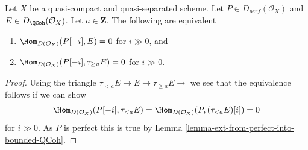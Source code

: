 \begin{lemma}
\label{lemma-bounded-truncation}
Let $X$ be a quasi-compact and quasi-separated scheme.
Let $P \in D_{perf}(\mathcal{O}_X)$ and $E \in D_{\QCoh}(\mathcal{O}_X)$. 
Let $a \in \mathbf{Z}$. The following are equivalent
\begin{enumerate}
\item $\Hom_{D(\mathcal{O}_X)}(P[-i], E) = 0$ for $i \gg 0$, and
\item $\Hom_{D(\mathcal{O}_X)}(P[-i], \tau_{\geq a} E) = 0$ for $i \gg 0$.
\end{enumerate}
\end{lemma}

\begin{proof}
Using the triangle $ \tau_{< a} E \to E \to \tau_{\geq a} E \to$
we see that the equivalence follows if we can show
$$
\Hom_{D(\mathcal{O}_X)}(P[-i], \tau_{< a} E) =
\Hom_{D(\mathcal{O}_X)}(P, (\tau_{< a} E)[i]) = 0 
$$
for $i \gg 0$. As $P$ is perfect this is true by
Lemma \ref{lemma-ext-from-perfect-into-bounded-QCoh}.
\end{proof}
